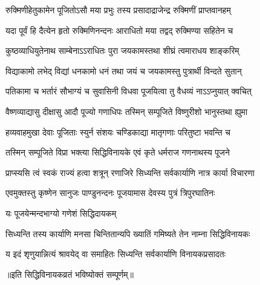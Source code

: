 \twolineshloka
{रुक्मिणीहेतुकामेन पूजितोऽसौ मया प्रभुः}
{तस्य प्रसादाद्राजेन्द्र रुक्मिणीं प्राप्तवानहम्}%

\twolineshloka
{यदा पूर्वं हि दैत्येन हृतो रुक्मिणिनन्दनः}
{आराधितो मया तद्वद् रुक्मिण्या सहितेन च}%

\twolineshloka
{कुष्ठव्याधियुतेनाथ साम्बेनाऽऽराधितः पुरा}
{जयकामस्तथा शीघ्रं त्वमाराधय शाङ्करिम्}%

\twolineshloka
{विद्याकामो लभेद् विद्यां धनकामो धनं तथा}
{जयं च जयकामस्तु पुत्रार्थी विन्दते सुतान्}%

\twolineshloka
{पतिकामा च भर्तारं सौभाग्यं च सुवासिनी}
{विधवा पूजयित्वा तु वैधव्यं नाऽऽप्नुयात् क्वचित्}%

\twolineshloka
{वैष्णव्याद्यासु दीक्षासु आदौ पूज्यो गणाधिपः}
{तस्मिन् सम्पूजिते विष्णुरीशो भानुस्तथा ह्युमा}%

\twolineshloka
{हव्यवाहमुखा देवाः पूजिताः स्युर्न संशयः}
{चण्डिकाद्या मातृगणाः परितुष्टा भवन्ति च}%

\twolineshloka
{तस्मिन् सम्पूजिते विप्रा भक्त्या सिद्धिविनायके}
{एवं कृते धर्मराज गणनाथस्य पूजने}%

\twolineshloka
{प्राप्स्यसि त्वं स्वकं राज्यं हत्वा शत्रून् रणाजिरे}
{सिध्यन्ति सर्वकार्याणि नात्र कार्या विचारणा}%

\twolineshloka
{एवमुक्तस्तु कृष्णेन सानुजः पाण्डुनन्दनः}
{पूजयामास देवस्य पुत्रं त्रिपुरघातिनः}%


\onelineshloka
{यः पूजयेन्मन्दभाग्यो गणेशं सिद्धिदायकम्}%

\twolineshloka
{सिध्यन्ति तस्य कार्याणि मनसा चिन्तितान्यपि}
{ख्यातिं गमिष्यते तेन नाम्ना सिद्धिविनायकः}%

\twolineshloka
{य इदं शृणुयान्नित्यं श्रावयेद् वा समाहितः}
{सिध्यन्ति सर्वकार्याणि विनायकप्रसादतः}%

॥इति सिद्धिविनायकव्रतं भविष्योक्तं सम्पूर्णम्॥
